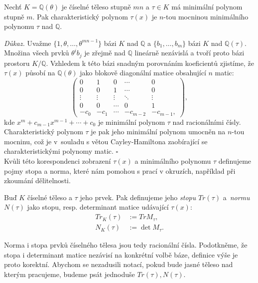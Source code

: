 \documentclass[12pt]{report}
\begin{document}
\begin{lemma}
Nechť $K = \mathbb{Q}(\theta)$ je číselné těleso stupně $mn$ a $\tau \in K$ má minimální polynom stupně $m$. Pak charakteristický polynom $\tau(x)$ je $n$-tou mocninou minimálního polynomu $\tau$ nad $\mathbb{Q}$. 
\end{lemma}
\noindent \textit{Důkaz.} Uvažme $\lbrace 1,\theta,\dots,\theta^{mn-1} \rbrace$ bázi $K$ nad $\mathbb{Q}$ a $\lbrace b_1,\dots,b_m \rbrace$ bázi $K$ nad $\mathbb{Q}(\tau)$. Množina všech prvků $\theta^i b_j$ je zřejmě nad $\mathbb{Q}$ lineárně nezávislá a tvoří proto bázi prostoru $K/\mathbb{Q}$. Vzhledem k této bázi snadným porovnáním koeficientů zjistíme, že $\tau(x)$ působí na $\mathbb{Q}(\theta)$ jako blokově diagonální matice obsahující $n$ matic:
\begin{equation*}
 \begin{pmatrix}
0 & 1 & 0 & \cdots & 0\\
0 & 0 & 1 & \cdots & 0\\
\vdots & \vdots & \vdots & \ddots &\vdots\\
0 & 0 & \cdots & 0& 1\\
-c_0 & -c_1 & \cdots & -c_{m-2} & -c_{m-1},
\end{pmatrix},
\end{equation*}
kde $x^m + c_{m-1} x^{m-1} + \cdots  + c_0$ je minimální polynom $\tau$ nad racionálními čísly. Charakteristický polynom $\tau$ je pak jeho minimální polynom umocněn na $n$-tou mocninu, což je v~souladu s větou Cayley-Hamiltona zaobírající se charakteristickými polynomy matic. \hfill $\square$\\

Kvůli této korespondenci zobrazení $\tau(x)$ a minimálního polynomu $\tau$ definujeme pojmy stopa a norma, které nám pomohou s prací v okruzích, například při zkoumání dělitelnosti.

\begin{definice}
Buď $K$ číselné těleso a $\tau$ jeho prvek. Pak definujeme jeho \textit{stopu} $Tr(\tau)$ a~\textit{normu} $N(\tau)$ jako stopu, resp. determinant matice udávající $\tau(x)$:
\begin{align*}
Tr_K(\tau) &:= Tr M_\tau,\\
N_K(\tau) &:= \det M_{\tau}.
\end{align*} 
\end{definice}

Norma i stopa prvků číselného tělesa jsou tedy racionální čísla. Podotkněme, že stopa i determinant matice nezávisí na konkrétní volbě báze, definice výše je proto korektní. Abychom se nezadusili notací, pokud bude jasné těleso nad kterým pracujeme, budeme psát jednoduše $Tr(\tau),N(\tau)$.
\end{document}
